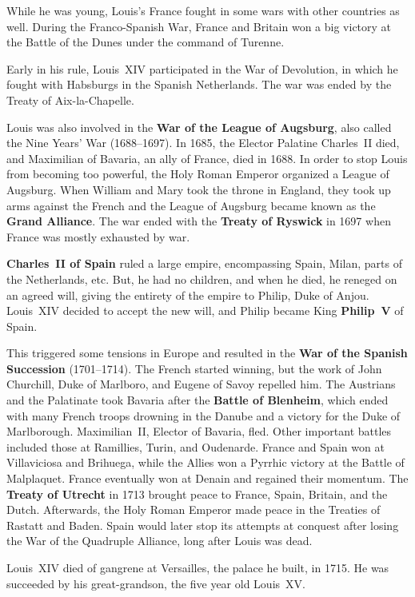 While he was young, Louis's France fought in some wars with other countries as well.
During the Franco-Spanish War,
France and Britain won a big victory at the Battle of the Dunes under the command of Turenne.

Early in his rule, Louis~XIV participated in the War of Devolution,
in which he fought with Habsburgs in the Spanish Netherlands.
The war was ended by the Treaty of Aix-la-Chapelle.

Louis was also involved in the \textbf{War of the League of Augsburg},
also called the Nine Years' War (1688--1697).
In 1685, the Elector Palatine Charles~II died,
and Maximilian of Bavaria, an ally of France, died in 1688.
In order to stop Louis from becoming too powerful, the Holy Roman Emperor organized a League of Augsburg.
When William and Mary took the throne in England,
they took up arms against the French and the League of Augsburg became known as the \textbf{Grand Alliance}.
The war ended with the \textbf{Treaty of Ryswick} in 1697 when France was mostly exhausted by war.

\textbf{Charles~II of Spain} ruled a large empire, encompassing Spain, Milan, parts of the Netherlands, etc.
But, he had no children, and when he died, he reneged on an agreed will,
giving the entirety of the empire to Philip, Duke of Anjou.
Louis~XIV decided to accept the new will, and Philip became King \textbf{Philip~V} of Spain.

This triggered some tensions in Europe
and resulted in the \textbf{War of the Spanish Succession} (1701--1714).
The French started winning, but the work of John Churchill, Duke of Marlboro, and Eugene of Savoy repelled him.
The Austrians and the Palatinate took Bavaria after the \textbf{Battle of Blenheim},
which ended with many French troops drowning in the Danube and a victory for the Duke of Marlborough.
Maximilian~II, Elector of Bavaria, fled.
Other important battles included those at Ramillies, Turin, and Oudenarde.
France and Spain won at Villaviciosa and Brihuega,
while the Allies won a Pyrrhic victory at the Battle of Malplaquet.
France eventually won at Denain and regained their momentum.
The \textbf{Treaty of Utrecht} in 1713 brought peace to France, Spain, Britain, and the Dutch.
Afterwards, the Holy Roman Emperor made peace in the Treaties of Rastatt and Baden.
Spain would later stop its attempts at conquest after losing the War of the Quadruple Alliance,
long after Louis was dead.

Louis~XIV died of gangrene at Versailles, the palace he built, in 1715.
He was succeeded by his great-grandson, the five year old Louis~XV\@.

